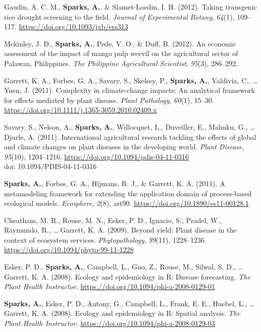 \documentclass[11pt, a4paper]{awesome-cv}
\begin{document}
\leavevmode\hypertarget{ref-Gaudin2012}{}%
Gaudin, A. C. M., \textbf{Sparks, A.}, \& Slamet-Loedin, I. H. (2012). Taking transgenic rice drought screening to the field. \emph{Journal of Experimental Botany}, \emph{64}(1), 109--117. \url{https://doi.org/10.1093/jxb/ers313}

\leavevmode\hypertarget{ref-Mckinley2012}{}%
Mckinley, J. D., \textbf{Sparks, A.}, Pede, V. O., \& Duff, B. (2012). An economic assessment of the impact of mango pulp weevil on the agricultural sector of Palawan, Philippines. \emph{The Philippine Agricultural Scientist}, \emph{95}(3), 286--292.

\leavevmode\hypertarget{ref-Garrett2011}{}%
Garrett, K. A., Forbes, G. A., Savary, S., Skelsey, P., \textbf{Sparks, A.}, Valdivia, C., \ldots{} Yuen, J. (2011). Complexity in climate-change impacts: An analytical framework for effects mediated by plant disease. \emph{Plant Pathology}, \emph{60}(1), 15--30. \url{https://doi.org/10.1111/j.1365-3059.2010.02409.x}

\leavevmode\hypertarget{ref-Savary2011}{}%
Savary, S., Nelson, A., \textbf{Sparks, A.}, Willocquet, L., Duveiller, E., Mahuku, G., \ldots{} Djurle, A. (2011). International agricultural research tackling the effects of global and climate changes on plant diseases in the developing world. \emph{Plant Disease}, \emph{95}(10), 1204--1216. \url{https://doi.org/10.1094/pdis-04-11-0316}\\
doi: 10.1094/PDIS-04-11-0316

\leavevmode\hypertarget{ref-Sparks2011}{}%
\textbf{Sparks, A.}, Forbes, G. A., Hijmans, R. J., \& Garrett, K. A. (2011). A metamodeling framework for extending the application domain of process-based ecological models. \emph{Ecosphere}, \emph{2}(8), art90. \url{https://doi.org/10.1890/es11-00128.1}

\leavevmode\hypertarget{ref-Cheatham2009}{}%
Cheatham, M. R., Rouse, M. N., Esker, P. D., Ignacio, S., Pradel, W., Raymundo, R., \ldots{} Garrett, K. A. (2009). Beyond yield: Plant disease in the context of ecosystem services. \emph{Phytopathology}, \emph{99}(11), 1228--1236. \url{https://doi.org/10.1094/phyto-99-11-1228}

\leavevmode\hypertarget{ref-Esker2008}{}%
Esker, P. D., \textbf{Sparks, A.}, Campbell, L., Guo, Z., Rouse, M., Silwal, S. D., \ldots{} Garrett, K. A. (2008). Ecology and epidemiology in R: Disease forecasting. \emph{The Plant Health Instructor}. \url{https://doi.org/10.1094/phi-a-2008-0129-01}

\leavevmode\hypertarget{ref-Sparks2008a}{}%
\textbf{Sparks, A.}, Esker, P. D., Antony, G., Campbell, L., Frank, E. E., Huebel, L., \ldots{} Garrett, K. A. (2008). Ecology and epidemiology in R: Spatial analysis. \emph{The Plant Health Instructor}. \url{https://doi.org/10.1094/phi-a-2008-0129-03}
\end{document}
